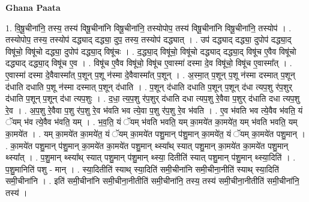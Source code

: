 \documentclass[17pt]{extarticle}
\begin{document}
\textbf{Ghana Paata } \newline

1. वि॒षू॒चीना॑नि॒ तस्य॒ तस्य॑ विषू॒चीना॑नि विषू॒चीना॑नि॒ तस्योपोप॒ तस्य॑ विषू॒चीना॑नि विषू॒चीना॑नि॒ तस्योप॑ । . तस्योपोप॒ तस्य॒ तस्योप॑ दद्ध्याद् दद्ध्या॒ दुप॒ तस्य॒ तस्योप॑ दद्ध्यात् । . उप॑ दद्ध्याद् दद्ध्या॒ दुपोप॑ दद्ध्या॒द् विषू॑चो॒ विषू॑चो दद्ध्या॒ दुपोप॑ दद्ध्या॒द् विषू॑चः । . द॒द्ध्या॒द् विषू॑चो॒ विषू॑चो दद्ध्याद् दद्ध्या॒द् विषू॑च ए॒वैव विषू॑चो दद्ध्याद् दद्ध्या॒द् विषू॑च ए॒व । . विषू॑च ए॒वैव विषू॑चो॒ विषू॑च ए॒वास्मा॑ दस्मा दे॒व विषू॑चो॒ विषू॑च ए॒वास्मा᳚त् । . ए॒वास्मा॑ दस्मा दे॒वैवास्मा᳚त् प॒शून् प॒शू न॑स्मा दे॒वैवास्मा᳚त् प॒शून् । . अ॒स्मा॒त् प॒शून् प॒शू न॑स्मा दस्मात् प॒शून् द॑धाति दधाति प॒शू न॑स्मा दस्मात् प॒शून् द॑धाति । . प॒शून् द॑धाति दधाति प॒शून् प॒शून् द॑धा त्यप॒शु र॑प॒शुर् द॑धाति प॒शून् प॒शून् द॑धा त्यप॒शुः । . द॒धा॒ त्य॒प॒शु र॑प॒शुर् द॑धाति दधा त्यप॒शु रे॒वैवा प॒शुर् द॑धाति दधा त्यप॒शु रे॒व । . अ॒प॒शु रे॒वैवा प॒शु र॑प॒शु रे॒व भ॑वति भव त्ये॒वा प॒शु र॑प॒शु रे॒व भ॑वति । . ए॒व भ॑वति भव त्ये॒वैव भ॑वति॒ यं ॅयम् भ॑व त्ये॒वैव भ॑वति॒ यम् । . भ॒व॒ति॒ यं ॅयम् भ॑वति भवति॒ यम् का॒मये॑त का॒मये॑त॒ यम् भ॑वति भवति॒ यम् का॒मये॑त । . यम् का॒मये॑त का॒मये॑त॒ यं ॅयम् का॒मये॑त पशु॒मान् प॑शु॒मान् का॒मये॑त॒ यं ॅयम् का॒मये॑त पशु॒मान् । . का॒मये॑त पशु॒मान् प॑शु॒मान् का॒मये॑त का॒मये॑त पशु॒मान् थ्स्या᳚थ् स्यात् पशु॒मान् का॒मये॑त का॒मये॑त पशु॒मान् थ्स्या᳚त् । . प॒शु॒मान् थ्स्या᳚थ् स्यात् पशु॒मान् प॑शु॒मान् थ्स्या॒ दितीति॑ स्यात् पशु॒मान् प॑शु॒मान् थ्स्या॒दिति॑ । . प॒शु॒मानिति॑ पशु - मान् । . स्या॒दितीति॑ स्याथ् स्या॒दिति॑ समी॒चीना॑नि समी॒चीना॒नीति॑ स्याथ् स्या॒दिति॑ समी॒चीना॑नि । . इति॑ समी॒चीना॑नि समी॒चीना॒नीतीति॑ समी॒चीना॑नि॒ तस्य॒ तस्य॑ समी॒चीना॒नीतीति॑ समी॒चीना॑नि॒ तस्य॑ । \newline
\end{document}
